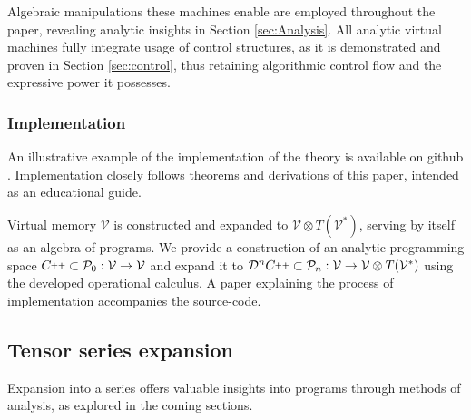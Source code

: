 \documentclass[smallcondensed]{svjour3}
\newcommand{\VV}{\mathcal{V}}
\newcommand{\CC}{C\nolinebreak\hspace{-.05em}\raisebox{.4ex}{\tiny\bf +}\nolinebreak\hspace{-.10em}\raisebox{.4ex}{\tiny\bf +}}
\def\CC{{C\nolinebreak[4]\hspace{-.05em}\raisebox{.4ex}{\tiny\bf ++}}}
\newcommand{\dP}{\mathcal{P}}
\newcommand{\DD}{\mathcal{D}}
\begin{document}
Algebraic manipulations these machines enable are employed throughout the paper, revealing analytic insights in Section \ref{sec:Analysis}.  All analytic virtual machines fully integrate usage of control structures, as it is demonstrated and proven in Section \ref{sec:control}, thus retaining algorithmic control flow and the expressive power it possesses.

\subsubsection{Implementation}

An illustrative example of the implementation of the theory is available on github \cite{dC++}. Implementation closely follows theorems and derivations of this paper, intended as an educational guide.

Virtual memory $\VV$ is constructed and expanded to $\VV\otimes T(\VV^*)$, serving by itself as an algebra of programs. We provide a construction of an analytic programming space $\CC\subset \dP_0:\VV\to\VV$ and expand it to $\DD^n\CC\subset\dP_n:\VV\to\VV\otimes T(\VV^*)$ using the developed operational calculus. A paper \cite{dC++Paper} explaining the process of implementation accompanies the source-code. 

 \subsection{Tensor series expansion}\label{sec:Vrsta}
 
 Expansion into a series offers valuable insights into programs through methods of analysis, as explored in the coming sections.
 
\end{document}
